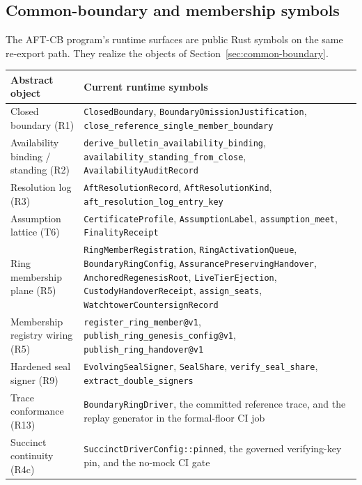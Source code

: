 \documentclass[11pt]{article}
\newcommand{\code}[1]{\texttt{#1}}
\begin{document}
\subsection{Common-boundary and membership symbols}

The AFT-CB program's runtime surfaces are public Rust symbols on the same
re-export path. They realize the objects of
Section~\ref{sec:common-boundary}.

\begin{center}
\small
\begin{tabularx}{\textwidth}{>{\raggedright\arraybackslash}p{} X}
\toprule
\textbf{Abstract object} & \textbf{Current runtime symbols} \\
\midrule
Closed boundary (R1) & \code{ClosedBoundary}, \code{BoundaryOmissionJustification}, \code{close\_reference\_single\_member\_boundary} \\
Availability binding / standing (R2) & \code{derive\_bulletin\_availability\_binding}, \code{availability\_standing\_from\_close}, \code{AvailabilityAuditRecord} \\
Resolution log (R3) & \code{AftResolutionRecord}, \code{AftResolutionKind}, \code{aft\_resolution\_log\_entry\_key} \\
Assumption lattice (T6) & \code{CertificateProfile}, \code{AssumptionLabel}, \code{assumption\_meet}, \code{FinalityReceipt} \\
Ring membership plane (R5) & \code{RingMemberRegistration}, \code{RingActivationQueue}, \code{BoundaryRingConfig}, \code{AssurancePreservingHandover}, \code{AnchoredRegenesisRoot}, \code{LiveTierEjection}, \code{CustodyHandoverReceipt}, \code{assign\_seats}, \code{WatchtowerCountersignRecord} \\
Membership registry wiring (R5) & \code{register\_ring\_member@v1}, \code{publish\_ring\_genesis\_config@v1}, \code{publish\_ring\_handover@v1} \\
Hardened seal signer (R9) & \code{EvolvingSealSigner}, \code{SealShare}, \code{verify\_seal\_share}, \code{extract\_double\_signers} \\
Trace conformance (R13) & \code{BoundaryRingDriver}, the committed reference trace, and the replay generator in the formal-floor CI job \\
Succinct continuity (R4c) & \code{SuccinctDriverConfig::pinned}, the governed verifying-key pin, and the no-mock CI gate \\
\bottomrule
\end{tabularx}
\end{center}
\end{document}
